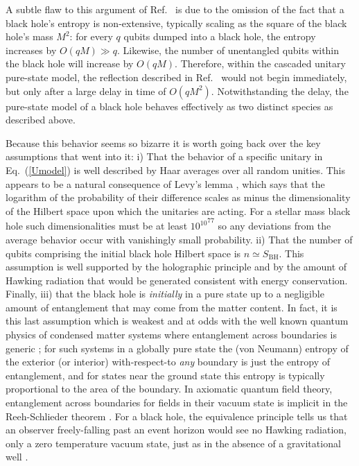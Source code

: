 \documentclass[aps,12pt]{revtex4}
\begin{document}
A subtle flaw to this argument of Ref.~ is due
to the omission of the fact that a black hole's entropy is
non-extensive, typically scaling as the square of the black hole's
mass $M^2$: for every $q$ qubits dumped into a black hole, the
entropy increases by $O(qM)\gg q$. Likewise, the number of
unentangled qubits within the black hole will increase by $O(qM)$.
Therefore, within the cascaded unitary pure-state model, the reflection
described in Ref.~ would not begin immediately,
but only after a large delay in time of $O(qM^2)$. Notwithstanding the
delay, the pure-state model of a black hole behaves effectively as
two distinct species as described above.

Because this behavior seems so bizarre it is worth going back over the
key assumptions that went into it: i) That the behavior of a specific
unitary in Eq.~(\ref{Umodel}) is well described by Haar averages over 
all random unities. This appears to be a natural consequence of
Levy's lemma \cite{Levy}, which says that the logarithm of the
probability of their difference scales as minus the dimensionality of
the Hilbert space upon which the unitaries are acting. For a stellar
mass black hole such dimensionalities must be at least ${10^{10}}^{77}$
so any deviations from the average behavior occur with vanishingly
small probability. ii) That the number of qubits comprising the initial
black hole Hilbert space is $n\simeq S_{\text{BH}}$. This assumption
is well supported by the holographic principle \cite{tHooft93} and
by the amount of Hawking radiation that would be generated consistent with
energy conservation. Finally, iii) that the black hole is
{\it initially\/} in a pure state up to a negligible amount of entanglement
that may come from the matter content. In fact, it is this last assumption
which is weakest and at odds with the well known quantum physics
of condensed matter systems where entanglement across boundaries is
generic \cite{Eisert09}; for such systems in a globally pure state
the (von Neumann) entropy of the exterior (or interior)
with-respect-to {\it any\/} boundary is just the entropy of
entanglement, and for states near the ground state this entropy is
typically proportional to the area of the boundary. In axiomatic
quantum field theory, entanglement across boundaries for fields in
their vacuum state is implicit in the Reeh-Schlieder
theorem \cite{Schlieder}. For a black hole, the equivalence principle
tells us that an observer freely-falling past an event horizon
would see no Hawking radiation, only a zero temperature vacuum
state, just as in the absence of a gravitational
well \cite{Susskind93}.
\end{document}
